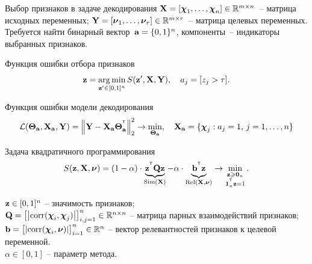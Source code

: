\documentclass[10pt]{beamer}
\begin{document}
\begin{frame}{Выбор признаков в задаче декодирования}
	$\mathbf{X} = [\boldsymbol{\chi}_1, \dots, \boldsymbol{\chi}_n] \in \mathbb{R}^{m \times n}$~-- матрица исходных переменных; $\mathbf{Y} = [\boldsymbol{\nu}_1, \dots, \boldsymbol{\nu}_r] \in \mathbb{R}^{m \times r}$~-- матрица целевых переменных. \\
	Требуется найти бинарный вектор~$\mathbf{a} = \{0, 1\}^n$, компоненты~-- индикаторы выбранных признаков. 
	\begin{block}{Функция ошибки отбора признаков}
		\vspace{-0.3cm}
		\[
			\mathbf{z} = \mathop{\arg \min}\limits_{\mathbf{z}' \in [0, 1]^n} S(\mathbf{z}', \mathbf{X}, \mathbf{Y}), \quad 
		a_j = [z_j > \tau].
		\]
		\vspace{-0.4cm}
	\end{block}
	\begin{block}{Функция ошибки модели декодирования}
		\vspace{-0.6cm}
		\[
			\mathcal{L}(\boldsymbol{\Theta}_{\mathbf{a}}, \mathbf{X}_{\mathbf{a}}, \mathbf{Y}) = {\left\| \mathbf{Y} - \mathbf{X}_{\mathbf{a}}\boldsymbol{\Theta}^{^{\text{\tiny\sffamily\upshape\mdseries T}}}_{\mathbf{a}} \right\| }_2^2 \rightarrow\min_{\boldsymbol{\Theta}_{\mathbf{a}}}, \quad \mathbf{X}_{\mathbf{a}} = \{\boldsymbol{\chi}_j: a_j = 1, \, j = 1, \dots, n\}
		\]
		\vspace{-0.6cm}
	\end{block}
	\begin{block}{Задача квадратичного программирования}
	\vspace{-0.3cm}
	\[
	S(\mathbf{z}, \mathbf{X}, \boldsymbol{\nu}) = (1 - \alpha) \cdot \underbrace{\mathbf{z}^{^{\text{\tiny\sffamily\upshape\mdseries T}}} \mathbf{Q} \mathbf{z}}_{\text{Sim}(\mathbf{X})} - \alpha \cdot \underbrace{\vphantom{()} \mathbf{b}^{^{\text{\tiny\sffamily\upshape\mdseries T}}} \mathbf{z}}_{\text{Rel}(\mathbf{X}, \boldsymbol{\nu})} \rightarrow \min_{\substack{\mathbf{z} \geqslant \boldsymbol{0}_n \\ \boldsymbol{1}_n^{^{\text{\tiny\sffamily\upshape\mdseries T}}} \mathbf{z}=1}}.
	\]
	\vspace{-0.6cm}
	\end{block}
		$\mathbf{z} \in [0, 1]^n$ -- значимость признаков; \\
		$\mathbf{Q} = \bigl[\left|\text{corr}(\boldsymbol{\chi}_i, \boldsymbol{\chi}_j)\right|\bigr]_{i,j=1}^n \in \mathbb{R}^{n \times n}$ -- матрица парных взаимодействий признаков; \\
		$\mathbf{b} = \bigl[\left|\text{corr}(\boldsymbol{\chi}_i, \boldsymbol{\nu})\right|\bigr]_{i=1}^n \in \mathbb{R}^n$ -- вектор релевантностей признаков к целевой переменной. \\
		$\alpha \in [0, 1]$ -- параметр метода.
\end{frame}
\end{document}
